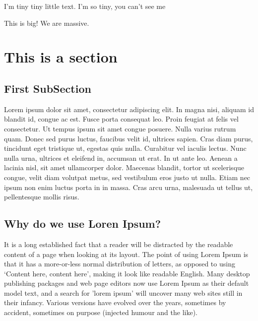 \documentclass[11pt,times]{article}
\begin{document}
\tiny I'm tiny tiny little text. I'm so tiny, you can't see me

\Huge This is big! We are massive.

\normalsize

\section{This is a section} %

\subsection{First SubSection} %

Lorem ipsum dolor sit amet, consectetur adipiscing elit. In magna nisi, aliquam 
id blandit id, congue ac est. Fusce porta consequat leo. Proin feugiat at felis 
vel consectetur. Ut tempus ipsum sit amet congue posuere. Nulla varius rutrum 
quam. Donec sed purus luctus, faucibus velit id, ultrices sapien. Cras diam 
purus, tincidunt eget tristique ut, egestas quis nulla. Curabitur vel iaculis 
lectus. Nunc nulla urna, ultrices et eleifend in, accumsan ut erat. In ut ante 
leo. Aenean a lacinia nisl, sit amet ullamcorper dolor. Maecenas blandit, 
tortor ut scelerisque congue, velit diam volutpat metus, sed vestibulum eros 
justo ut nulla. Etiam nec ipsum non enim luctus porta in in massa. Cras arcu 
urna, malesuada ut tellus ut, pellentesque mollis risus.


\subsection{Why do we use Loren Ipsum?} %

It is a long established fact that a reader will be distracted by the readable 
content of a page when looking at its layout. The point of using Lorem Ipsum is 
that it has a more-or-less normal distribution of letters, as opposed to using 
`Content here, content here', making it look like readable English. Many 
desktop publishing packages and web page editors now use Lorem Ipsum as their 
default model text, and a search for 'lorem ipsum' will uncover many web sites 
still in their infancy. Various versions have evolved over the years, sometimes 
by accident, sometimes on purpose (injected humour and the like).
\end{document}
